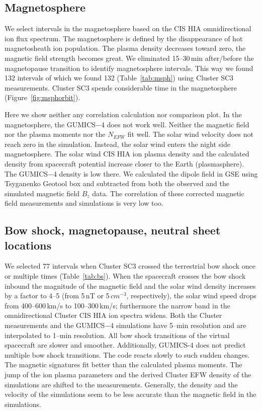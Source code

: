 \documentclass[linenumbers,draft]{agujournal}
\begin{document}
\subsection{Magnetosphere}
\label{sec:msph}

We select intervals in the magnetosphere based on the CIS HIA omnidirectional ion flux spectrum. The magnetosphere is defined by the disappearance of hot magnetosheath ion population. The plasma density decreases toward zero, the magnetic field strength becomes great. We eliminated 15--30\,min after/before the magnetopause transition to identify magnetosphere intervals. This way we found 132 intervals of which we found 132 (Table~\ref{tab:msph}) using Cluster SC3 measurements. Cluster SC3 spends considerable time in the magnetosphere (Figure~\ref{fig:msphorbit}). 

Here we show neither any correlation calculation nor comparison plot. In the magnetosphere, the GUMICS$-$4 does not work well. Neither the magnetic field nor the plasma moments nor the $N_{EFW}$ fit well. The solar wind velocity does not reach zero in the simulation. Instead, the solar wind enters the night side magnetosphere. The solar wind CIS HIA ion plasma density and the calculated density from spacecraft potential increase closer to the Earth (plasmasphere). The GUMICS$-$4 density is low there. We calculated the dipole field in GSE using Tsyganenko Geotool box \citep{tsyganenko95:_model_earth} and subtracted from both the observed and the simulated magnetic field $B_z$ data. The correlation of these corrected magnetic field measurements and simulations is very low too. 

\subsection{Bow shock, magnetopause, neutral sheet locations}
\label{sec:bs}

We selected 77 intervals when Cluster SC3 crossed the terrestrial bow shock once or multiple times (Table~\ref{tab:bs}). When the spacecraft crosses the bow shock inbound the magnitude of the magnetic field and the solar wind density increases by a factor to 4--5 (from 5\,nT or 5\,$cm^{-3}$, respectively), the solar wind speed drops from 400--600\,km/s to 100--300\,km/s; furthermore the narrow band in the omnidirectional Cluster CIS HIA ion spectra widens. Both the Cluster measurements and the GUMICS$-$4 simulations have 5--min resolution and are interpolated to 1--min resolution. All bow shock transitions of the virtual spacecraft are slower and smoother. Additionally, GUMICS-4 does not predict multiple bow shock transitions. The code reacts slowly to such sudden changes. The magnetic signatures fit better than the calculated plasma moments. The jump of the ion plasma parameters and the derived Cluster EFW density of the simulations are shifted to the measurements. Generally, the density and the velocity of the simulations seem to be less accurate than the magnetic field in the simulations.
\end{document}
